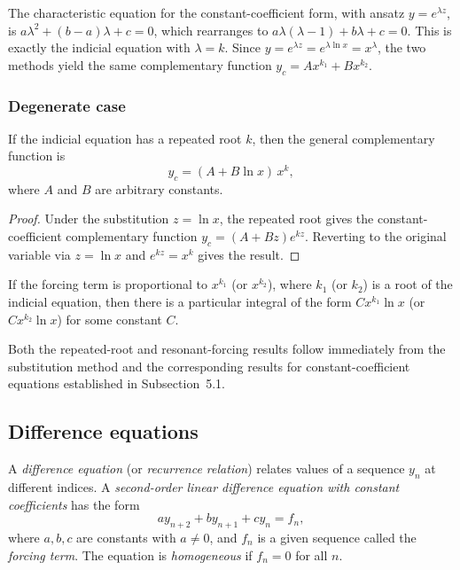 \documentclass[a4paper]{article}
\begin{document}
\begin{remark}
  The characteristic equation for the constant-coefficient form, with ansatz $y = e^{\lambda z}$, is $a\lambda^2 + (b - a)\lambda + c = 0$, which rearranges to $a\lambda(\lambda - 1) + b\lambda + c = 0$. This is exactly the indicial equation with $\lambda = k$. Since $y = e^{\lambda z} = e^{\lambda \ln x} = x^\lambda$, the two methods yield the same complementary function $y_c = Ax^{k_1} + Bx^{k_2}$.
\end{remark}

\subsubsection{Degenerate case}
\begin{prop}
  If the indicial equation has a repeated root $k$, then the general complementary function is
  \[
    y_c = (A + B\ln x)\, x^k,
  \]
  where $A$ and $B$ are arbitrary constants.
\end{prop}
\begin{proof}
  Under the substitution $z = \ln x$, the repeated root gives the constant-coefficient complementary function $y_c = (A + Bz)e^{kz}$. Reverting to the original variable via $z = \ln x$ and $e^{kz} = x^k$ gives the result.
\end{proof}

\begin{prop}
  If the forcing term is proportional to $x^{k_1}$ (or $x^{k_2}$), where $k_1$ (or $k_2$) is a root of the indicial equation, then there is a particular integral of the form $Cx^{k_1}\ln x$ (or $Cx^{k_2}\ln x$) for some constant $C$.
\end{prop}

\begin{remark}
  Both the repeated-root and resonant-forcing results follow immediately from the substitution method and the corresponding results for constant-coefficient equations established in Subsection~5.1.
\end{remark}

\subsection{Difference equations}
\begin{defi}
  A \emph{difference equation} (or \emph{recurrence relation}) relates values of a sequence $y_n$ at different indices. A \emph{second-order linear difference equation with constant coefficients} has the form
  \[
    ay_{n + 2} + by_{n + 1} + cy_n = f_n,
  \]
  where $a, b, c$ are constants with $a \neq 0$, and $f_n$ is a given sequence called the \emph{forcing term}. The equation is \emph{homogeneous} if $f_n = 0$ for all $n$.
\end{defi}
\end{document}
